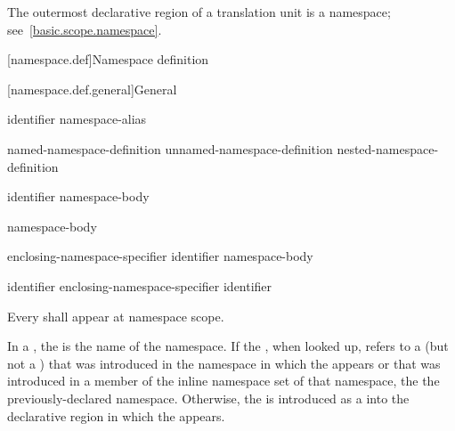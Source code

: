 \pnum
The outermost declarative region of a translation unit is a namespace;
see~\ref{basic.scope.namespace}.

[namespace.def]{Namespace definition}%

[namespace.def.general]{General}%
%

\begin{bnf}
\br
        identifier\br
        namespace-alias
\end{bnf}

\begin{bnf}
\br
        named-namespace-definition\br
        unnamed-namespace-definition\br
        nested-namespace-definition
\end{bnf}

\begin{bnf}
\br
           identifier \terminal{\{} namespace-body \terminal{\}}
\end{bnf}

\begin{bnf}
\br
           \terminal{\{} namespace-body \terminal{\}}
\end{bnf}

\begin{bnf}
\br
         enclosing-namespace-specifier \terminal{::}  identifier \terminal{\{} namespace-body \terminal{\}}
\end{bnf}

\begin{bnf}
\br
        identifier\br
        enclosing-namespace-specifier \terminal{::}  identifier
\end{bnf}

\begin{bnf}
\br
\end{bnf}

\pnum
Every  shall appear at namespace scope.

\pnum
In a ,
the  is the name of the namespace.
If the , when looked up,
refers to a  (but not a )
that was introduced in the namespace
in which the  appears
or that was introduced in a member of the inline namespace set of that namespace,
the 
 the previously-declared namespace.
Otherwise, the  is introduced
as a  into the declarative region
in which the  appears.

